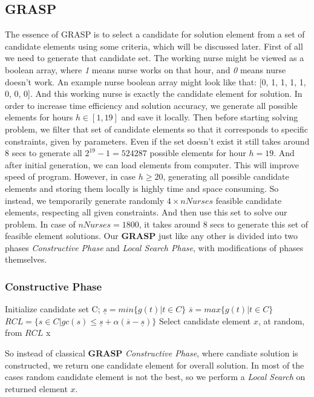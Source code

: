\documentclass{article}
\newcommand\tab[1][1cm]{\hspace*{#1}}
\begin{document}
	\subsection{GRASP}
\tab The essence of GRASP is to select a candidate for solution element from a set of candidate elements using some criteria, which will be discussed later. First of all we need to generate that candidate set. The working nurse might be viewed as a boolean array, where \textit{1} means nurse works on that hour, and \textit{0} means nurse doesn't work. An example nurse boolean array might look like that: [0, 1, 1, 1, 1, 0, 0, 0]. And this working nurse is exactly the candidate element for solution. In order to increase time efficiency and solution accuracy, we generate all possible elements for hours $h \in [1,19]$ and save it locally. Then before starting solving problem, we filter that set of candidate elements so that it corresponds to specific constraints, given by parameters. Even if the set doesn't exist it still takes around 8 secs to generate all $2^{19} - 1 = 524287$ possible elements for hour $h = 19.$ And after initial generation, we can load elements from computer. This will improve speed of program. However, in case $h \geq 20$, generating all possible candidate elements and storing them locally is highly time and space consuming. So instead, we temporarily generate randomly $4 \times nNurses$ feasible candidate elements, respecting all given constraints. And then use this set to solve our problem. In case of $nNurses = 1800$, it takes around 8 secs to generate this set of feasible element solutions. Our \textbf{GRASP} just like any other is divided into two phases \textit{Constructive Phase} and \textit{Local Search Phase}, with modifications of phases themselves.
	\subsubsection{Constructive Phase}
		\begin{algorithmic}
			\State Initialize candidate set C;
			\State $\underline{s} = min\{g(t) | t \in C \}$
			\State $\overline{s} = max\{g(t) | t \in C \}$
			\State $RCL = \{s \in C | gc(s) \leq \underline{s} + \alpha(\overline{s} - \underline{s}) \}$
			\State Select candidate element $x$, at random, from $RCL$
			\State \Return x 
		\EndFunction
		\end{algorithmic}
\tab So instead of classical \textbf{GRASP} \textit{Constructive Phase}, where candiate solution is constructed, we return one candidate element for overall solution. In most of the cases random candidate element is not the best, so we perform a \textit{Local Search} on returned element $x.$
\end{document}
